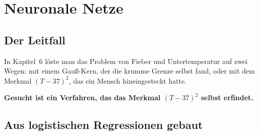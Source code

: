 \chapter{Neuronale Netze}

\section{Der Leitfall}

\begin{merksatz}
In Kapitel~6 löste man das Problem von Fieber und Untertemperatur auf zwei Wegen: mit einem Gauß-Kern, der die krumme Grenze selbst fand, oder mit dem Merkmal $(T-37)^{2}$, das ein Mensch hineingesteckt hatte.

\begin{center}
\begin{minipage}{0.9\textwidth}
\textbf{Gesucht ist ein Verfahren, das das Merkmal $(T-37)^{2}$ selbst erfindet.}
\end{minipage}
\end{center}

\begin{center}
\begin{minipage}{0.88\textwidth}
\end{minipage}
\end{center}
\end{merksatz}

\section{Aus logistischen Regressionen gebaut}

